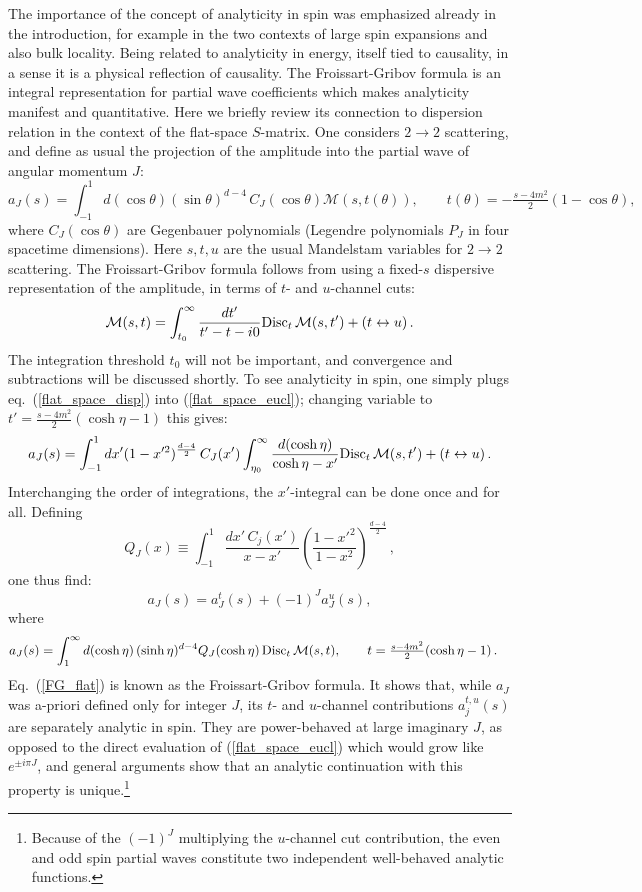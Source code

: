\documentclass[11pt, reqno,preprint]{article}
\def\be{\begin{equation}}
\def\ee{\end{equation}}
\def\j{J}
\begin{document}
The importance of the concept of analyticity in spin was emphasized already in the introduction,
for example in the two contexts of large spin expansions and also bulk locality.
Being related to analyticity in energy, itself tied to causality, in a sense it is a physical reflection of causality.
The Froissart-Gribov formula is an integral representation for partial wave coefficients
which makes analyticity manifest and quantitative.
Here we briefly review its connection to dispersion relation in the context of the flat-space $S$-matrix.
One considers $2\to 2$ scattering, and define as usual the projection of the amplitude
into the partial wave of angular momentum $\j$:
\be
 a_\j(s) = \int_{-1}^1 d(\cos\theta) (\sin\theta)^{d-4}\,C_\j(\cos\theta) \mathcal{M}(s,t(\theta)),\qquad
 t(\theta)=-\tfrac{s-4m^2}{2}(1-\cos\theta), \label{flat_space_eucl}
\ee
where $C_\j(\cos\theta)$ are Gegenbauer polynomials (Legendre polynomials $P_\j$ in four spacetime dimensions).
Here $s,t,u$ are the usual Mandelstam variables for $2\to 2$ scattering.
The Froissart-Gribov formula follows from using a fixed-$s$ dispersive representation of the amplitude,
in terms of $t$- and $u$-channel cuts:
\be
 \mathcal{M}(s,t) =
   \int_{t_0}^\infty \frac{dt'}{t'-t-i0} {\rm Disc}_t\,\mathcal{M}(s,t') + (t\leftrightarrow u)\,. \label{flat_space_disp}
\ee
The integration threshold $t_0$ will not be important, and convergence and subtractions will be discussed shortly.
To see analyticity in spin, one simply plugs eq.~(\ref{flat_space_disp}) into (\ref{flat_space_eucl});
changing variable to $t'=\tfrac{s-4m^2}{2}(\cosh\eta-1)$ this gives:
\be
 a_\j(s) = \int_{-1}^1 dx' (1-x'^2)^{\frac{d-4}{2}}\,C_\j(x')
 \int_{\eta_0}^\infty \frac{d(\cosh\eta)}{\cosh\eta-x'} {\rm Disc}_t\,\mathcal{M}(s,t') + (t\leftrightarrow u)\,.
\ee
Interchanging the order of integrations, the $x'$-integral can be done once and for all.
Defining
\be
 Q_\j(x) \equiv \int_{-1}^1 \frac{dx'\,C_j(x')}{x-x'} \left( \frac{1-x'^2}{1-x^2}\right)^{\frac{d-4}{2}}\,,
\ee
one thus find:
\be
 a_\j(s) = a_\j^t(s) + (-1)^\j a_\j^u(s), \label{flat_tu}
\ee
where
\be\begin{aligned}
 a_\j(s) &= \int_{1}^\infty d(\cosh\eta)\,(\sinh\eta)^{d-4} Q_\j(\cosh\eta)\,{\rm Disc}_t\,\mathcal{M}(s,t),\qquad t=\tfrac{s-4m^2}{2}(\cosh\eta-1)\,. \label{FG_flat}
\end{aligned}\ee
Eq.~(\ref{FG_flat}) is known as the Froissart-Gribov formula.  It shows that, while $a_\j$ was a-priori defined only for integer $\j$,
its $t$- and $u$-channel contributions $a_j^{t,u}(s)$ are separately analytic in spin.
They are power-behaved at large imaginary $\j$, as opposed to the direct evaluation of (\ref{flat_space_eucl}) which would
grow like $e^{\pm i\pi \j}$, and general arguments show that an analytic continuation with this property is unique.\footnote{
Because of the $(-1)^\j$ multiplying the $u$-channel cut contribution,
the even and odd spin partial waves constitute two independent well-behaved analytic functions.}
\end{document}

